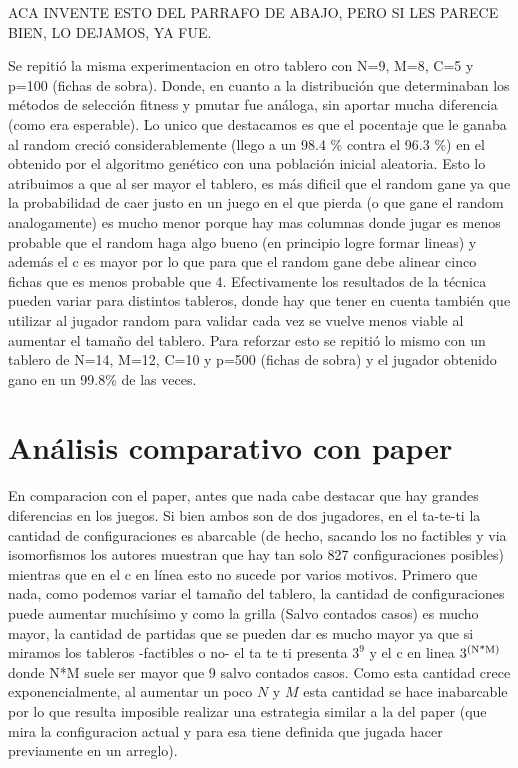 \documentclass[A4paper,oneside,fleqn,11pt]{article}
\theoremstyle{definition}
\begin{document}
ACA INVENTE ESTO DEL PARRAFO DE ABAJO, PERO SI LES PARECE BIEN, LO DEJAMOS, YA FUE.

Se repitió la misma experimentacion en otro tablero con N=9, M=8, C=5 y p=100 (fichas de sobra). Donde, en cuanto a la distribución que determinaban los métodos de selección fitness y pmutar fue análoga, sin aportar mucha diferencia (como era esperable). Lo unico que destacamos es que el pocentaje que le ganaba al random creció considerablemente (llego a un 98.4 \% contra el 96.3 \%) en el obtenido por el algoritmo genético con una población inicial aleatoria. Esto lo atribuimos a que al ser mayor el tablero, es más dificil que el random gane ya que la probabilidad de caer justo en un juego en el que pierda (o que gane el random analogamente) es mucho menor porque hay  mas columnas donde jugar es menos probable que el random haga algo bueno (en principio logre formar lineas) y además el c es mayor por lo que para que el random gane debe alinear cinco fichas que es menos probable que 4. Efectivamente los resultados de la técnica pueden variar para distintos tableros, donde hay que tener en cuenta también que utilizar al jugador random para validar cada vez se vuelve menos viable al aumentar el tamaño del tablero. Para reforzar esto se repitió lo mismo con un tablero de N=14, M=12, C=10 y p=500 (fichas de sobra) y el jugador obtenido gano en un 99.8\% de las veces.



\section{Análisis comparativo con paper}

En comparacion con el paper, antes que nada cabe destacar que hay grandes diferencias en los juegos. Si bien ambos son de dos jugadores, en el ta-te-ti la cantidad de configuraciones es abarcable (de hecho, sacando los no factibles y via isomorfismos los autores muestran que hay tan solo 827 configuraciones posibles) mientras que en el c en línea esto no sucede por varios motivos. Primero que nada, como podemos variar el tamaño del tablero, la cantidad de configuraciones puede aumentar muchísimo y como la grilla (Salvo contados casos) es mucho mayor, la cantidad de partidas que se pueden dar es mucho mayor ya que si miramos los tableros -factibles o no- el ta te ti presenta $3^9$ y el c en linea $3\textsuperscript{(N*M)}$ donde N*M suele ser mayor que 9 salvo contados casos. Como esta cantidad crece exponencialmente, al aumentar un poco $N$ y $M$ esta cantidad se hace inabarcable por lo que resulta imposible realizar una estrategia similar a la del paper (que mira la configuracion actual y para esa tiene definida que jugada hacer previamente en un arreglo).
\end{document}
